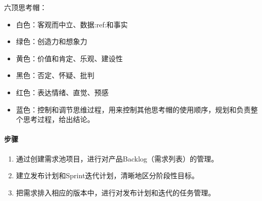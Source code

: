 \documentclass[letterpaper,11pt,english]{sphinxmanual}
\begin{document}
六顶思考帽：
%
\begin{footnote}[739]\sphinxAtStartFootnote
{}
%
\end{footnote}
\begin{itemize}
\item {} 
白色：客观而中立、数据:ref:和事实

\item {} 
绿色：创造力和想象力

\item {} 
黄色：价值和肯定、乐观、建设性

\item {} 
黑色：否定、怀疑、批判

\item {} 
红色：表达情绪、直觉、预感

\item {} 
蓝色：控制和调节思维过程，用来控制其他思考帽的使用顺序，规划和负责整个思考过程，给出结论。

\end{itemize}


\paragraph{步骤}
\label{\detokenize{chapter_project/Scrum:id7}}\begin{enumerate}
%
\item {} 
通过创建需求池项目，进行对产品Backlog（需求列表）的管理。

\item {} 
建立发布计划和Sprint迭代计划，清晰地区分阶段性目标。

\item {} 
把需求排入相应的版本中，进行对发布计划和迭代的任务管理。

\end{enumerate}
\end{document}
